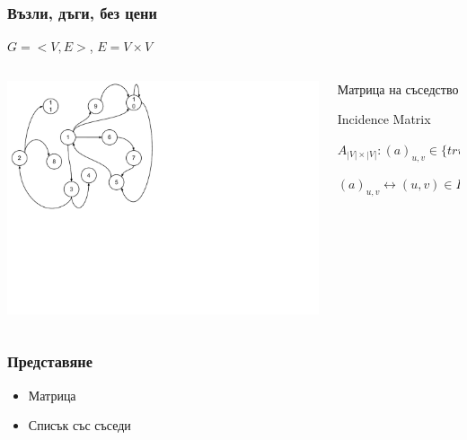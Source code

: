 \documentclass{beamer}
\begin{document}
\begin{frame}[fragile]
\frametitle{Възли, дъги, без цени}

\begin{center}
  $G=<V,E>$, $E=V \times V$
\end{center}

\begin{columns}[t]
  \begin{column}{0.55\textwidth}
    \includegraphics[width=13cm]{images/graph_numbers}
  \end{column}
  \begin{column}{0.45\textwidth}
    \begin{flushleft}

    \vspace{-250px}
      Матрица на съседство

      Incidence Matrix

      $A_{|V|\times|V|}:(a)_{u,v} \in \{true,false\}$

      $(a)_{u,v} \leftrightarrow(u,v)\in E$
      
    \end{flushleft}
  \end{column}
\end{columns}



\end{frame}



\begin{frame}[fragile]
\frametitle{Представяне}

\begin{itemize}
  \item Матрица
  \item Списък със съседи 
\end{itemize}

\end{frame}
\end{document}
